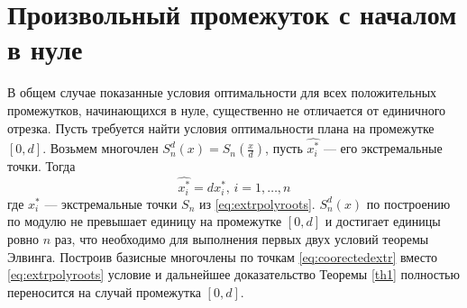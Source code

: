\documentclass[specialist,
               substylefile = spbu.rtx,
               subf,href,colorlinks=true, 12pt]{disser}
\theoremstyle{definition}
\begin{document}
	\section{Произвольный промежуток с началом в нуле}
	
	В общем случае показанные условия оптимальности для всех положительных промежутков, начинающихся в нуле, существенно не отличается от единичного отрезка. Пусть требуется найти условия оптимальности плана на промежутке $[0, d]$. Возьмем многочлен $S_n^d(x) = S_n(\frac{x}{d})$, пусть $\widehat{x_i^*}$ --- его экстремальные точки. Тогда
	\begin{equation}
	\label{eq:coorectedextr}
		\widehat{x_i^*} = d x_i^*, \, i = 1, \ldots, n
	\end{equation}
	где $x_i^*$ --- экстремальные точки $S_n$ из \eqref{eq:extrpolyroots}. $S_n^d(x)$ по построению по модулю не превышает единицу на промежутке $[0, d]$ и достигает единицы ровно $n$ раз, что необходимо для выполнения первых двух условий теоремы Элвинга. Построив базисные многочлены по точкам \eqref{eq:coorectedextr} вместо \eqref{eq:extrpolyroots} условие и дальнейшее доказательство Теоремы \ref{th1} полностью переносится на случай промежутка $[0, d]$.
	
	
\end{document}
